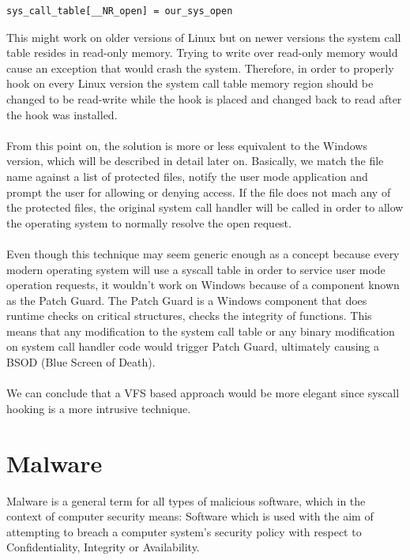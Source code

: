 	\begin{Verbatim}[fontsize=\small, commandchars=\\\{\}]
	sys_call_table[__NR_open] = our_sys_open
	\end{Verbatim}
	
	This might work on older versions of Linux but on newer versions the system call table resides in read-only memory. Trying to write over read-only memory would cause an exception that would crash the system. Therefore, in order to properly hook on every Linux version the system call table memory region should be changed to be read-write while the hook is placed and changed back to read after the hook was installed. 
	
	\paragraph{}
	From this point on, the solution is more or less equivalent to the Windows version, which will be described in detail later on. Basically, we match the file name against a list of protected files, notify the user mode application and prompt the user for allowing or denying access. If the file does not mach any of the protected files, the original system call handler will be called in order to allow the operating system to normally resolve the open request.
	
	\paragraph{}
	Even though this technique may seem generic enough as a concept because every modern operating system will use a syscall table in order to service user mode operation requests, it wouldn't work on Windows because of a component known as the Patch Guard. The Patch Guard is a Windows component that does runtime checks on critical structures, checks the integrity of functions. This means that any modification to the system call table or any binary modification on system call handler code would trigger Patch Guard, ultimately causing a BSOD (Blue Screen of Death).

	\paragraph{}
	We can conclude that a VFS based approach would be more elegant since syscall hooking is a more intrusive technique.
	
	\newpage
	\section{Malware}
	Malware is a general term for all types of malicious software, which in the context of
	computer security means: Software which is used with the aim of attempting to breach a computer system’s security policy with respect to Confidentiality, Integrity or Availability\cite{AnIntroductionToMalware}.
	
